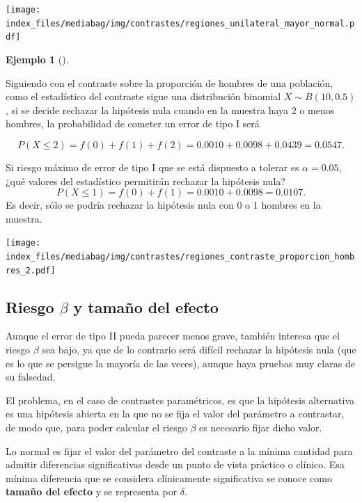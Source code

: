\documentclass[
  a4paper,
]{scrreport}
\theoremstyle{plain}
\theoremstyle{definition}
\theoremstyle{definition}
\newtheorem{example}{Ejemplo}[chapter]
\theoremstyle{remark}
\begin{document}
\begin{center}
\texttt{[image: index\_files/mediabag/img/contrastes/regiones\_unilateral\_mayor\_normal.pdf]}
\end{center}

\begin{example}[]\protect\hypertarget{exm-regiones-aceptacion-rechazo}{}\label{exm-regiones-aceptacion-rechazo}

Siguiendo con el contraste sobre la proporción de hombres de una
población, como el estadístico del contraste sigue una distribución
binomial \(X\sim B(10,0.5)\), si se decide rechazar la hipótesis nula
cuando en la muestra haya 2 o menos hombres, la probabilidad de cometer
un error de tipo I será

\[P(X\leq 2)= f(0)+f(1)+f(2)= 0.0010 + 0.0098 + 0.0439 = 0.0547.\]

Si riesgo máximo de error de tipo I que se está dispuesto a tolerar es
\(\alpha=0.05\), ¿qué valores del estadístico permitirán rechazar la
hipótesis nula? \[P(X\leq 1)= f(0)+f(1) = 0.0010 + 0.0098 = 0.0107.\] Es
decir, sólo se podría rechazar la hipótesis nula con 0 o 1 hombres en la
muestra.

\begin{center}
\texttt{[image: index\_files/mediabag/img/contrastes/regiones\_contraste\_proporcion\_hombres\_2.pdf]}
\end{center}

\end{example}

\subsection{\texorpdfstring{Riesgo \(\beta\) y tamaño del
efecto}{Riesgo \textbackslash beta y tamaño del efecto}}\label{riesgo-beta-y-tamauxf1o-del-efecto}

Aunque el error de tipo II pueda parecer menos grave, también interesa
que el riesgo \(\beta\) sea bajo, ya que de lo contrario será difícil
rechazar la hipótesis nula (que es lo que se persigue la mayoría de las
veces), aunque haya pruebas muy claras de su falsedad.

El problema, en el caso de contrastes paramétricos, es que la hipótesis
alternativa es una hipótesis abierta en la que no se fija el valor del
parámetro a contrastar, de modo que, para poder calcular el riesgo
\(\beta\) es necesario fijar dicho valor.

Lo normal es fijar el valor del parámetro del contraste a la mínima
cantidad para admitir diferencias significativas desde un punto de vista
práctico o clínico. Esa mínima diferencia que se considera clínicamente
significativa se conoce como \textbf{tamaño del efecto} y se representa
por \(\delta\).
\end{document}

